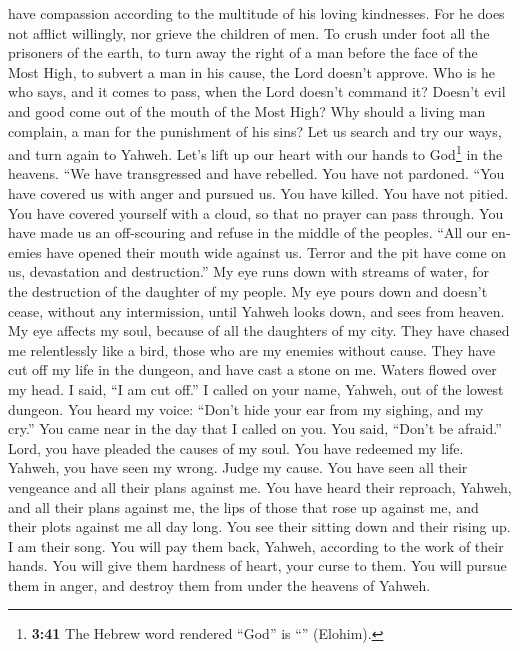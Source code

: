 \begin{paracol}{2}
\begin{otherlanguage}{english}
have compassion according to the multitude of his loving kindnesses.
 For he does not afflict willingly, nor grieve the
children of men.  To crush under foot all the prisoners
of the earth,  to turn away the right of a man before the
face of the Most High,  to subvert a man in his cause,
the Lord doesn't approve.  Who is he who says, and it
comes to pass, when the Lord doesn't command it?  Doesn't
evil and good come out of the mouth of the Most High? 
Why should a living man complain, a man for the punishment of his sins?
 Let us search and try our ways, and turn again to
Yahweh.  Let's lift up our heart with our hands to
God\footnote{\textbf{3:41} The Hebrew word rendered ``God'' is
  ``'' (Elohim).} in the heavens.  ``We
have transgressed and have rebelled. You have not pardoned.
 ``You have covered us with anger and pursued us. You
have killed. You have not pitied.  You have covered
yourself with a cloud, so that no prayer can pass through.
 You have made us an off-scouring and refuse in the
middle of the peoples.  ``All our enemies have opened
their mouth wide against us.  Terror and the pit have
come on us, devastation and destruction.''  My eye runs
down with streams of water, for the destruction of the daughter of my
people.  My eye pours down and doesn't cease, without any
intermission,  until Yahweh looks down, and sees from
heaven.  My eye affects my soul, because of all the
daughters of my city.  They have chased me relentlessly
like a bird, those who are my enemies without cause. 
They have cut off my life in the dungeon, and have cast a stone on me.
 Waters flowed over my head. I said, ``I am cut off.''
 I called on your name, Yahweh, out of the lowest
dungeon.  You heard my voice: ``Don't hide your ear from
my sighing, and my cry.''  You came near in the day that
I called on you. You said, ``Don't be afraid.''  Lord,
you have pleaded the causes of my soul. You have redeemed my life.
 Yahweh, you have seen my wrong. Judge my cause.
 You have seen all their vengeance and all their plans
against me.  You have heard their reproach, Yahweh, and
all their plans against me,  the lips of those that rose
up against me, and their plots against me all day long. 
You see their sitting down and their rising up. I am their song.
 You will pay them back, Yahweh, according to the work of
their hands.  You will give them hardness of heart, your
curse to them.  You will pursue them in anger, and
destroy them from under the heavens of Yahweh.


\end{otherlanguage}
\end{paracol}
